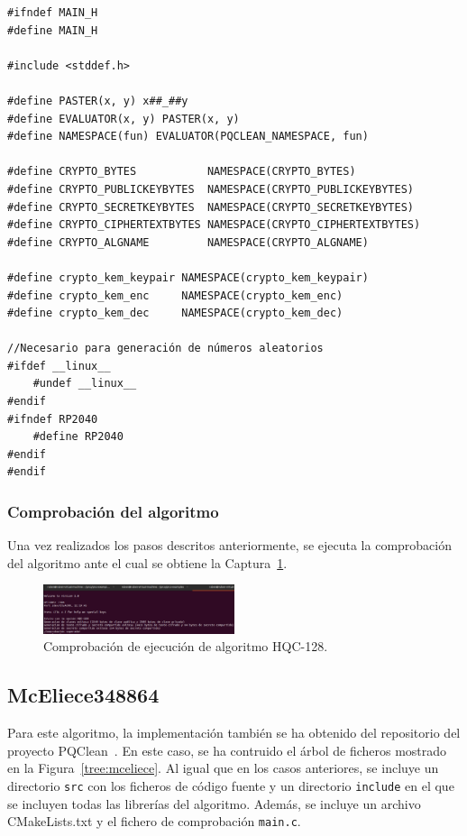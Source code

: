 \begin{lstlisting}[label={lst:hqc-mainh},style=Cnice,firstnumber=1,caption={Archivo \texttt{HQC-128/main.h}.}]
#ifndef MAIN_H
#define MAIN_H

#include <stddef.h>

#define PASTER(x, y) x##_##y
#define EVALUATOR(x, y) PASTER(x, y)
#define NAMESPACE(fun) EVALUATOR(PQCLEAN_NAMESPACE, fun)

#define CRYPTO_BYTES           NAMESPACE(CRYPTO_BYTES)
#define CRYPTO_PUBLICKEYBYTES  NAMESPACE(CRYPTO_PUBLICKEYBYTES)
#define CRYPTO_SECRETKEYBYTES  NAMESPACE(CRYPTO_SECRETKEYBYTES)
#define CRYPTO_CIPHERTEXTBYTES NAMESPACE(CRYPTO_CIPHERTEXTBYTES)
#define CRYPTO_ALGNAME         NAMESPACE(CRYPTO_ALGNAME)

#define crypto_kem_keypair NAMESPACE(crypto_kem_keypair)
#define crypto_kem_enc     NAMESPACE(crypto_kem_enc)
#define crypto_kem_dec     NAMESPACE(crypto_kem_dec)

//Necesario para generación de números aleatorios
#ifdef __linux__
    #undef __linux__
#endif
#ifndef RP2040
    #define RP2040
#endif
#endif
\end{lstlisting}


\subsubsection{Comprobación del algoritmo}\label{subsubsec:hqc-comp}

Una vez realizados los pasos descritos anteriormente, se ejecuta la comprobación del algoritmo ante el cual se obtiene la Captura~\ref{fig:hqc-check}.

\begin{figure}[h]
    \centering
    \includegraphics[width=0.5\textwidth]{figures/hqc-check.png}
    \caption{Comprobación de ejecución de algoritmo HQC-128.}
    \label{fig:hqc-check}
\end{figure}


\subsection{McEliece348864}\label{subsec:mceliece}

Para este algoritmo, la implementación también se ha obtenido del repositorio del proyecto PQClean~\cite{pqclean-github}.
En este caso, se ha contruido el árbol de ficheros mostrado en la Figura~\ref{tree:mceliece}.
Al igual que en los casos anteriores, se incluye un directorio \texttt{src} con los ficheros de código fuente y un directorio \texttt{include} en el que se incluyen todas las librerías del algoritmo.
Además, se incluye un archivo CMakeLists.txt y el fichero de comprobación \texttt{main.c}.

